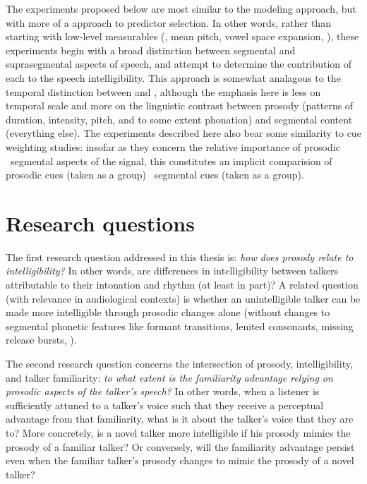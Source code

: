 The experiments proposed below are most similar to the modeling approach, but with more of a  approach to predictor selection.  In other words, rather than starting with low-level measurables (\eg, mean pitch, vowel space expansion, \etc), these experiments begin with a broad distinction between segmental and suprasegmental aspects of speech, and attempt to determine the contribution of each to the speech intelligibility.  This approach is somewhat analagous to the temporal distinction between  and  \citep{Rosen1992}, although the emphasis here is less on temporal scale and more on the linguistic contrast between prosody (patterns of duration, intensity, pitch, and to some extent phonation) and segmental content (everything else).  The experiments described here also bear some similarity to cue weighting studies: insofar as they concern the relative importance of prosodic \vs\ segmental aspects of the signal, this constitutes an implicit comparision of prosodic cues (taken as a group) \vs\ segmental cues (taken as a group).

\section{Research questions}
The first research question addressed in this thesis is: {\em how does prosody relate to intelligibility?}  In other words, are differences in intelligibility between talkers attributable to their intonation and rhythm (at least in part)?  A related question (with relevance in audiological contexts) is whether an unintelligible talker can be made more intelligible through prosodic changes alone (without changes to segmental phonetic features like formant transitions, lenited consonants, missing release bursts, \etc).


The second research question concerns the intersection of prosody, intelligibility, and talker familiarity: {\em to what extent is the familiarity advantage relying on prosodic aspects of the talker’s speech?}  In other words, when a  listener is sufficiently attuned to a talker’s voice such that they receive a perceptual advantage from that familiarity, what is it about the talker’s voice that they are  to?  More concretely, is a novel talker more intelligible if his prosody mimics the prosody of a familiar talker?  Or conversely, will the familiarity advantage persist even when the familiar talker’s prosody changes to mimic the prosody of a novel talker?

